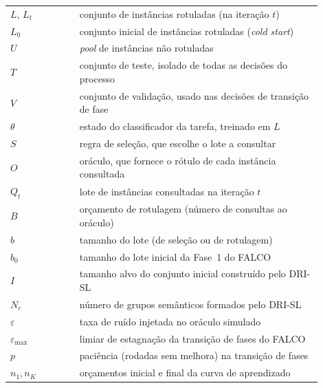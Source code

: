 

\begin{listasimb}

\begin{longtable}[l]{p{0.2\linewidth}p{0.7\linewidth}}
$L$, $L_t$ & conjunto de instâncias rotuladas (na iteração $t$)\\
$L_0$ & conjunto inicial de instâncias rotuladas (\textit{cold start})\\
$U$ & \textit{pool} de instâncias não rotuladas\\
$T$ & conjunto de teste, isolado de todas as decisões do processo\\
$V$ & conjunto de validação, usado nas decisões de transição de fase\\
$\theta$ & estado do classificador da tarefa, treinado em $L$\\
$S$ & regra de seleção, que escolhe o lote a consultar\\
$O$ & oráculo, que fornece o rótulo de cada instância consultada\\
$Q_t$ & lote de instâncias consultadas na iteração $t$\\
$B$ & orçamento de rotulagem (número de consultas ao oráculo)\\
$b$ & tamanho do lote (de seleção ou de rotulagem)\\
$b_0$ & tamanho do lote inicial da Fase~1 do FALCO\\
$I$ & tamanho alvo do conjunto inicial construído pelo DRI-SL\\
$N_c$ & número de grupos semânticos formados pelo DRI-SL\\
$\varepsilon$ & taxa de ruído injetada no oráculo simulado\\
$\varepsilon_{\max}$ & limiar de estagnação da transição de fases do FALCO\\
$p$ & paciência (rodadas sem melhora) na transição de fases\\
$n_1, n_K$ & orçamentos inicial e final da curva de aprendizado\\
\end{longtable}

\end{listasimb}

